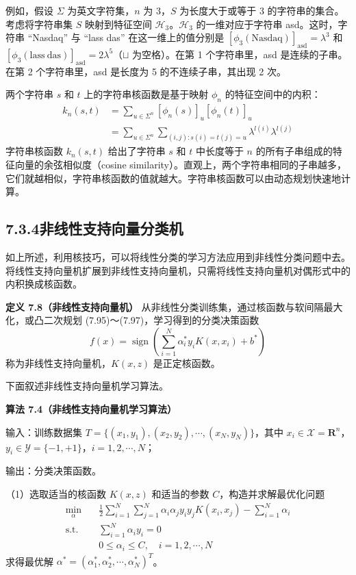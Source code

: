 \documentclass[UTF8, 12pt, fontset=fandol, oneside]{ctexart}
\begin{document}
例如，假设 $\Sigma$ 为英文字符集，$n$ 为 3，$S$ 为长度大于或等于 3 的字符串的集合。考虑将字符串集 $S$ 映射到特征空间 $\mathcal{H}_3$。$\mathcal{H}_3$ 的一维对应于字符串 asd。这时，字符串 “Nasdaq” 与 “lass das” 在这一维上的值分别是 $[\phi_3(\mathrm{Nasdaq})]_{\mathrm{asd}}=\lambda^3$ 和 $[\phi_3(\mathrm{lass\ das})]_{\mathrm{asd}}=2\lambda^5$（$\sqcup$ 为空格）。在第 1 个字符串里，asd 是连续的子串。在第 2 个字符串里，asd 是长度为 5 的不连续子串，其出现 2 次。

两个字符串 $s$ 和 $t$ 上的字符串核函数是基于映射 $\phi_n$ 的特征空间中的内积：
\begin{equation}
\begin{aligned}
k_n(s,t)
&=\sum_{u\in\Sigma^n}[\phi_n(s)]_u[\phi_n(t)]_u\\
&=\sum_{u\in\Sigma^n}\sum_{(i,j):s(i)=t(j)=u}\lambda^{l(i)}\lambda^{l(j)}
\end{aligned}
\tag{7.93}
\end{equation}
字符串核函数 $k_n(s,t)$ 给出了字符串 $s$ 和 $t$ 中长度等于 $n$ 的所有子串组成的特征向量的余弦相似度（cosine similarity）。直观上，两个字符串相同的子串越多，它们就越相似，字符串核函数的值就越大。字符串核函数可以由动态规划快速地计算。

\subsection*{7.3.4\quad 非线性支持向量分类机}

如上所述，利用核技巧，可以将线性分类的学习方法应用到非线性分类问题中去。将线性支持向量机扩展到非线性支持向量机，只需将线性支持向量机对偶形式中的内积换成核函数。

\noindent\textbf{定义 7.8（非线性支持向量机）}\quad
从非线性分类训练集，通过核函数与软间隔最大化，或凸二次规划 (7.95)～(7.97)，学习得到的分类决策函数
\begin{equation}
f(x)=\operatorname{sign}\left(\sum_{i=1}^N\alpha_i^*y_iK(x,x_i)+b^*\right)
\tag{7.94}
\end{equation}
称为非线性支持向量机，$K(x,z)$ 是正定核函数。

下面叙述非线性支持向量机学习算法。

\noindent\textbf{算法 7.4（非线性支持向量机学习算法）}

输入：训练数据集 $T=\{(x_1,y_1),(x_2,y_2),\cdots,(x_N,y_N)\}$，其中 $x_i\in\mathcal{X}=\mathbf{R}^n$，$y_i\in\mathcal{Y}=\{-1,+1\}$，$i=1,2,\cdots,N$；

输出：分类决策函数。

（1）选取适当的核函数 $K(x,z)$ 和适当的参数 $C$，构造并求解最优化问题
\begin{equation}
\begin{aligned}
\min_\alpha\quad & \frac{1}{2}\sum_{i=1}^N\sum_{j=1}^N\alpha_i\alpha_j y_i y_jK(x_i,x_j)-\sum_{i=1}^N\alpha_i\\
\mathrm{s.t.}\quad & \sum_{i=1}^N\alpha_i y_i=0\\
& 0\leq \alpha_i\leq C,\quad i=1,2,\cdots,N
\end{aligned}
\tag{7.95--7.97}
\end{equation}
求得最优解 $\alpha^*=(\alpha_1^*,\alpha_2^*,\cdots,\alpha_N^*)^T$。
\end{document}
